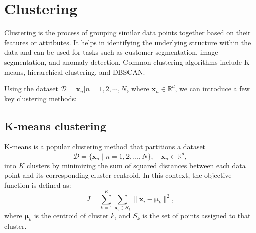 \documentclass[12pt]{article}
\begin{document}
\section{Clustering}
 Clustering is the process of grouping similar data points together based on their features or attributes. It helps in identifying the underlying structure within the data and can be used for tasks such as customer segmentation, image segmentation, and anomaly detection. Common clustering algorithms include K-means, hierarchical clustering, and DBSCAN.

 
Using the dataset $\mathcal{D} = {\bm{x}_n | n = 1, 2, \cdots, N}$, where $\bm{x}_n\in \mathbb{R}^d$, we can introduce a few key clustering methods:





\subsection{K-means clustering}

K-means is a popular clustering method that partitions a dataset 
\[
\mathcal{D} = \{ \bm{x}_n \mid n=1,2,\ldots,N\}, \quad \bm{x}_n \in \mathbb{R}^d,
\]
into $K$ clusters by minimizing the sum of squared distances between each data point and its corresponding cluster centroid. In this context, the objective function is defined as:
\begin{equation}
J = \sum_{k=1}^{K} \sum_{\bm{x}_i \in S_k} \lVert \bm{x}_i - \bm{\mu}_k \rVert^2,
\end{equation}
where $\bm{\mu}_k$ is the centroid of cluster $k$, and $S_k$ is the set of points assigned to that cluster. 
\end{document}
